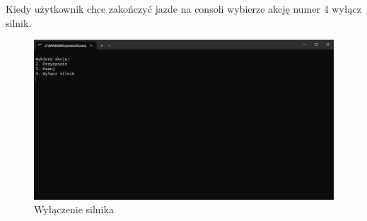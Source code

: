 Kiedy użytkownik chce zakończyć jazde na consoli wybierze akcję numer 4 wyłącz silnik.

\begin{figure}[!ht]
	\centering
		\includegraphics[width=17cm]{Wyłączenie silnika.png}
	\caption{\footnotesize Wyłączenie silnika}
	\label{fig:plotend}
\end{figure}
